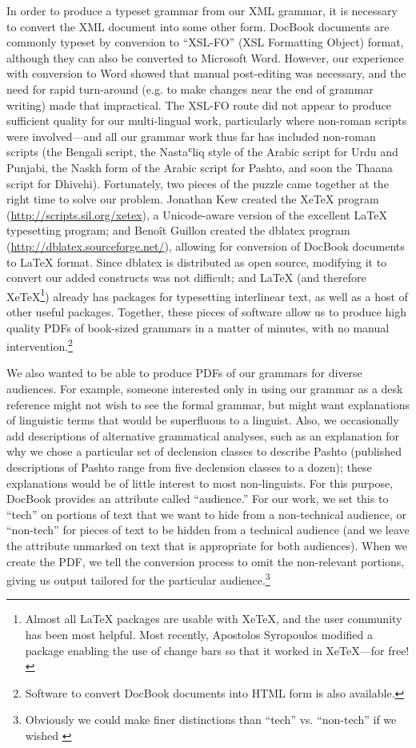 In order to produce a typeset grammar from our XML grammar, it is necessary to convert the XML document into some other form. DocBook documents are commonly typeset by conversion to ``XSL-FO'' (XSL Formatting Object) format, although they can also be converted to Microsoft Word. However, our experience with conversion to Word showed that manual post-editing was necessary, and the need for rapid turn-around (e.g. to make changes near the end of grammar writing) made that impractical. The XSL-FO route did not appear to produce sufficient quality for our multi-lingual work, particularly where non-roman scripts were involved---and all our grammar work thus far has included non-roman scripts (the Bengali script, the Nastaʿliq style of the Arabic script for Urdu and Punjabi, the Naskh form of the Arabic script for Pashto, and soon the Thaana script for Dhivehi). Fortunately, two pieces of the puzzle came together at the right time to solve our problem. Jonathan Kew created the XeTeX program (\url{http://scripts.sil.org/xetex}), a Unicode-aware version of the excellent LaTeX typesetting program; and Benoît Guillon created the dblatex program (\url{http://dblatex.sourceforge.net/}), allowing for conversion of DocBook documents to LaTeX format. Since dblatex is distributed as open source, modifying it to convert our added constructs was not difficult; and LaTeX (and therefore XeTeX\footnote{Almost
  all LaTeX packages are usable with XeTeX, and the user community has been most helpful. Most recently, Apostolos Syropoulos modified a package enabling the use of change bars so that it worked in XeTeX---for free!
}) 
already has packages for typesetting interlinear text, as well as a host of other useful packages. Together, these pieces of software allow us to produce high quality PDFs of book-sized grammars in a matter of minutes, with no manual intervention.\footnote{Software
  to convert DocBook documents into HTML form is also available.
}

We also wanted to be able to produce PDFs of our grammars for diverse audiences. For example, someone interested only in using our grammar as a desk reference might not wish to see the formal grammar, but might want explanations of linguistic terms that would be superfluous to a linguist. Also, we occasionally add descriptions of alternative grammatical analyses, such as an explanation for why we chose a particular set of declension classes to describe Pashto (published descriptions of Pashto range from five declension classes to a dozen); these explanations would be of little interest to most non-linguists. For this purpose, DocBook provides an attribute called ``audience.'' For our work, we set this to ``tech'' on portions of text that we want to hide from a non-technical audience, or ``non-tech'' for pieces of text to be hidden from a technical audience (and we leave the attribute unmarked on text that is appropriate for both audiences). When we create the PDF, we tell the conversion process to omit the non-relevant portions, giving us output tailored for the particular audience.\footnote{Obviously
  we could make finer distinctions than ``tech'' vs. ``non-tech'' if we wished \citep{Barabytv}
}

